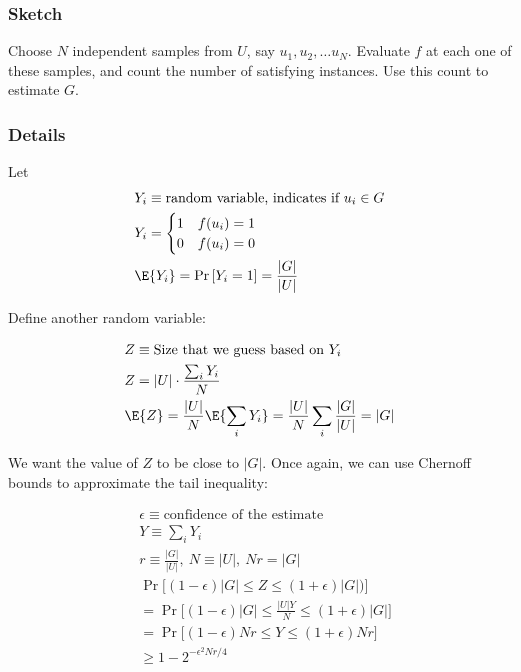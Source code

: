 \subsubsection{Sketch}
Choose $N$ independent samples from $U$, say $u_1, u_2, \dots u_N$. Evaluate
$f$ at each one of these samples, and count the number of satisfying instances.
Use this count to estimate $G$.

\subsubsection{Details}

Let 
\begin{align*}
    &Y_i \equiv \text{random variable, indicates if $u_i \in G$} \\
    &Y_i = \begin{cases}
        1 & f(u_i) = 1 \\
        0 & f(u_i) = 0
    \end{cases} \\
    &\E{Y_i} = \Pr{[Y_i = 1]} = \frac{|G|}{|U|} \\
\end{align*}

Define another random variable:

\begin{align*}
    &Z \equiv \text{Size that we guess based on $Y_i$} \\
    &Z = |U| \cdot \frac{\sum_i Y_i}{N} \\
    &\E{Z} = \frac{|U|}{N}\E{\sum_i Y_i} =  \frac{|U|}{N} \sum_i \frac{|G|}{|U|} = |G|
\end{align*}

We want the value of $Z$ to be close to $|G|$. Once again, we can use Chernoff
bounds to approximate the tail inequality:

\begin{align*}
    &\epsilon \equiv \text{confidence of the estimate} \\
    & Y \equiv \sum_i Y_i \\
    & r \equiv \frac{|G|}{|U|},~ N \equiv |U|,~ Nr = |G| \\
    &\Pr \big[ (1 - \epsilon)|G| \leq Z \leq (1 + \epsilon)|G|) \big] \\
    &=\Pr \big[ (1 - \epsilon)|G| \leq \frac{|U|Y}{N} \leq (1 + \epsilon)|G| \big] \\
    &=\Pr \big[ (1 - \epsilon)Nr \leq  Y \leq (1 + \epsilon)Nr \big] \\
    &\geq 1 - 2^{-\epsilon^2 Nr / 4}
\end{align*}
